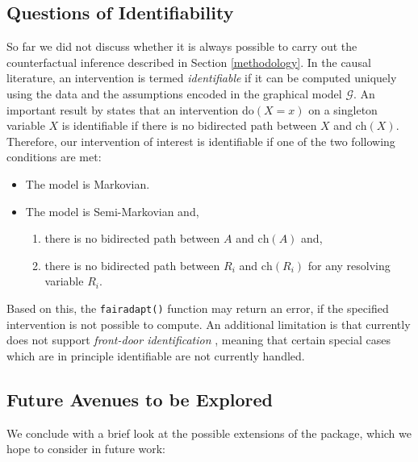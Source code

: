 \documentclass[
  nojss]{jss}
\providecommand{\tightlist}{%
  \setlength{\itemsep}{0pt}\setlength{\parskip}{0pt}}
\begin{document}
\hypertarget{questions-of-identifiability}{%
\subsection{Questions of
Identifiability}\label{questions-of-identifiability}}

So far we did not discuss whether it is always possible to carry out the
counterfactual inference described in Section \ref{methodology}. In the
causal literature, an intervention is termed \emph{identifiable} if it
can be computed uniquely using the data and the assumptions encoded in
the graphical model \(\mathcal{G}\). An important result by
\cite{tian2002general} states that an intervention do\((X = x)\) on a
singleton variable \(X\) is identifiable if there is no bidirected path
between \(X\) and \(\mathrm{ch}(X)\). Therefore, our intervention of
interest is identifiable if one of the two following conditions are met:

\begin{itemize}
\tightlist
\item
  The model is Markovian.
\item
  The model is Semi-Markovian and,

  \begin{enumerate}
  \def\labelenumi{(\roman{enumi})}
  \tightlist
  \item
    there is no bidirected path between \(A\) and \(\mathrm{ch}(A)\)
    and,
  \item
    there is no bidirected path between \(R_i\) and \(\mathrm{ch}(R_i)\)
    for any resolving variable \(R_i\).
  \end{enumerate}
\end{itemize}

Based on this, the \texttt{fairadapt()} function may return an error, if
the specified intervention is not possible to compute. An additional
limitation is that  currently does not support
\emph{front-door identification} \citep[Chapter~3]{pearl2009causality},
meaning that certain special cases which are in principle identifiable
are not currently handled.

\hypertarget{future-avenues-to-be-explored}{%
\subsection{Future Avenues to be
Explored}\label{future-avenues-to-be-explored}}

We conclude with a brief look at the possible extensions of the
 package, which we hope to consider in future work:
\end{document}
